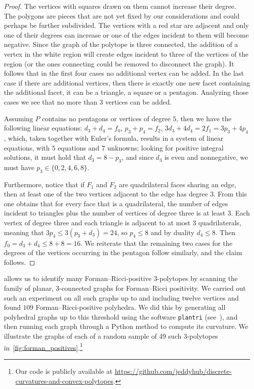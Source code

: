 \documentclass[11pt,a4paper]{amsart}
\begin{document}
\begin{proof}
    The vertices with squares drawn on them cannot increase their degree. The polygons are pieces that are not yet fixed by our considerations and could perhaps be further subdivided. The vertices with a red star are adjacent and only one of their degrees can increase or one of the edges incident to them will become negative. Since the graph of the polytope is three connected, the addition of a vertex in the white region will create edges incident to three of the vertices of the region (or the ones connecting could be removed to disconnect the graph). It follows that in the first four cases no additional vertex can be added. In the last case if there are additional vertices, then there is exactly one new facet containing the additional facet, it can be a triangle, a square or a pentagon. Analyzing those cases we see that no more than 3 vertices can be added.
    
    Assuming $P$ contains no pentagons or vertices of degree $5$, then we have the following linear equations: $d_3+d_4 =f_0$, $p_3+p_4=f_2$, $3d_3+4d_4 = 2f_1 = 3p_3 +4p_4$, which, taken together with Euler's formula, results in a system of linear equations, with $5$ equations and $7$ unknowns; looking for positive integral solutions, it must hold that $d_3 = 8-p_3$, and since $d_3$ is even and nonnegative, we must have $p_3 \in\{0,2,4,6,8\}$. 
    
    Furthermore, notice that if $F_1$ and $F_2$ are quadrilateral faces sharing an edge, then at least one of the two vertices adjacent to the edge has degree 3. From this one obtains that for every face that is a quadrilateral, the number of edges incident to triangles plus the number of vertices of degree three is at least $3$. Each vertex of degree three and each triangle is adjacent to at most 3 quadrilaterals, meaning that $3p_4\le 3(p_3+d_3)= 24$, so $p_4\le 8$ and by duality $d_4\le 8$. Then $f_0 = d_3+d_4\le 8+8 = 16$. We reiterate that the remaining two cases for the degrees of the vertices occurring in the pentagon follow similarly, and the claim follows.
\end{proof}

 allows us to identify many Forman--Ricci-positive $3$-polytopes by scanning the family of planar, $3$-connected graphs for Forman--Ricci positivity. We carried out such an experiment on all such graphs up to and including twelve vertices and found $109$ Forman--Ricci-positive polyhedra. We did this by generating all polyhedral graphs up to this threshold using the software \texttt{plantri} (see~\cite{McKayGraphs,OEIS_A000944,plantri}), and then running each graph through a Python method to compute its curvature. We illustrate the graphs of each of a random sample of 49 such $3$-polytopes in~\cref{fig:forman_positives}.\footnote{Our code is publicly available at \href{https://github.com/jeddyhub/discrete-curvatures-and-convex-polytopes}{https://github.com/jeddyhub/discrete-curvatures-and-convex-polytopes}.} 
\end{document}
